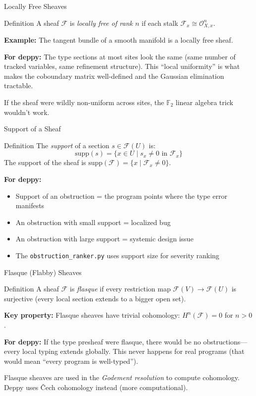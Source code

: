 \documentclass[aspectratio=169,10pt]{beamer}
\newcommand{\Fscr}{\mathcal{F}}
\newcommand{\Oscr}{\mathcal{O}}
\begin{document}
\begin{frame}{Locally Free Sheaves}
\begin{block}{Definition}
A sheaf $\Fscr$ is \emph{locally free of rank $n$} if each stalk $\Fscr_x \cong \Oscr_{X,x}^n$.
\end{block}

\textbf{Example:} The tangent bundle of a smooth manifold is a locally free sheaf.

\vspace{0.3em}
\textbf{For deppy:} The type sections at most sites look the same (same number of tracked variables, same refinement structure). This ``local uniformity'' is what makes the coboundary matrix well-defined and the Gaussian elimination tractable.

\vspace{0.3em}
If the sheaf were wildly non-uniform across sites, the $\mathbb{F}_2$ linear algebra trick wouldn't work.
\end{frame}

\begin{frame}{Support of a Sheaf}
\begin{block}{Definition}
The \emph{support} of a section $s \in \Fscr(U)$ is:
\[
\text{supp}(s) = \{x \in U \mid s_x \neq 0 \text{ in } \Fscr_x\}
\]
The support of the sheaf is $\text{supp}(\Fscr) = \{x \mid \Fscr_x \neq 0\}$.
\end{block}

\textbf{For deppy:}
\begin{itemize}
  \item Support of an obstruction = the program points where the type error manifests
  \item An obstruction with small support = localized bug
  \item An obstruction with large support = systemic design issue
  \item The \texttt{obstruction\_ranker.py} uses support size for severity ranking
\end{itemize}
\end{frame}

\begin{frame}{Flasque (Flabby) Sheaves}
\begin{block}{Definition}
A sheaf $\Fscr$ is \emph{flasque} if every restriction map $\Fscr(V) \to \Fscr(U)$ is surjective (every local section extends to a bigger open set).
\end{block}

\textbf{Key property:} Flasque sheaves have trivial cohomology: $H^n(\Fscr) = 0$ for $n > 0$.

\vspace{0.3em}
\textbf{For deppy:} If the type presheaf were flasque, there would be no obstructions---every local typing extends globally. This never happens for real programs (that would mean ``every program is well-typed'').

\vspace{0.3em}
Flasque sheaves are used in the \emph{Godement resolution} to compute cohomology. Deppy uses \v{C}ech cohomology instead (more computational).
\end{frame}
\end{document}
